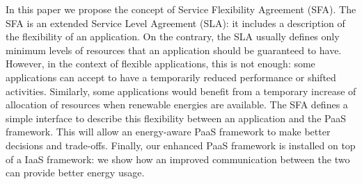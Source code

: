 In this paper we propose the concept of Service Flexibility Agreement (SFA). 
The SFA is an extended Service Level Agreement (SLA): it includes a description of the flexibility of an application.
On the contrary, the SLA usually defines only minimum levels of resources that an application should be guaranteed to have.
However, in the context of flexible applications, this is not enough: some applications can accept to have a temporarily reduced performance or shifted activities.
Similarly, some applications would benefit from a temporary increase of allocation of resources when renewable energies are available.
The SFA defines a simple interface to describe this flexibility between an application and the PaaS framework. 
This will allow an energy-aware PaaS framework to make better decisions and trade-offs. %
Finally, our enhanced PaaS framework is installed on top of a IaaS framework: we show how an improved communication between the two can provide better energy usage.






